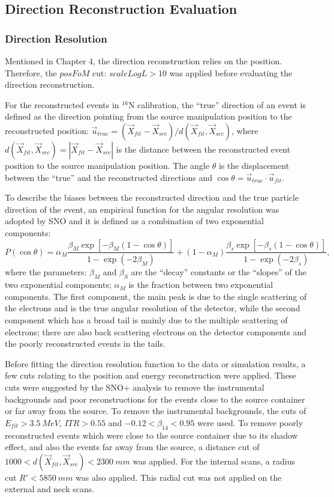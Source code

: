 \subsection{Direction Reconstruction Evaluation}
\subsubsection{Direction Resolution}
Mentioned in Chapter 4, the direction reconstruction relies on the position. Therefore, the $posFoM$ cut: $scaleLogL>10$ was applied before evaluating the direction reconstruction. 

For the reconstructed events in $^{16}$N calibration, the ``true'' direction of an event is defined as the direction pointing from the source manipulation position to the reconstructed position: $\vec{u}_{true} = (\vec{X}_{fit}-\vec{X}_{src})/d(\vec{X}_{fit},\vec{X}_{src})$, where $d(\vec{X}_{fit},\vec{X}_{src})=|\vec{X}_{fit}-\vec{X}_{src}|$ is the distance between the reconstructed event position to the source manipulation position. The angle $\theta$ is the displacement between the ``true'' and the reconstructed directions and $\cos\theta=\vec{u}_{true}\cdot \vec{u}_{fit}$.

To describe the biases between the reconstructed direction and the true particle direction of the event, an empirical function for the angular resolution was adopted by SNO\cite{boulay2004direct} and it is defined as a combination of two exponential components:
\begin{equation}
P(\cos\theta)=\alpha_M\frac{\beta_M\exp[-\beta_M(1-\cos\theta)]}{1-\exp(-2\beta_M)}+(1-\alpha_M)\frac{\beta_s\exp[-\beta_s(1-\cos\theta)]}{1-\exp(-2\beta_s)},
\end{equation}
where the parameters: $\beta_M$ and $\beta_S$ are the ``decay'' constants or the ``slopes'' of the two exponential components; $\alpha_M$ is the fraction between two exponential components. The first component, the main peak is due to the single scattering of the electrons and is the true angular resolution of the detector, while the second component which has a broad tail is mainly due to the multiple scattering of electrons; there are also back scattering electrons on the detector components and the poorly reconstructed events in the tails\cite{boulay2004direct}.

Before fitting the direction resolution function to the data or simulation results, a few cuts relating to the position and energy reconstruction were applied. These cuts were suggested by the SNO+ analysis to remove the instrumental backgrounds and poor reconstructions for the events close to the source container or far away from the source. To remove the instrumental backgrounds, the cuts of $E_{fit}>3.5~MeV$, $ITR>0.55$ and $-0.12<\beta_{14}<0.95$ were used. To remove poorly reconstructed events which were close to the source container due to its shadow effect, and also the events far away from the source, a distance cut of $1000<d(\vec{X}_{fit},\vec{X}_{src})<2300~mm$ was applied. For the internal scans, a radius cut $R'<5850~mm$ was also applied. This radial cut was not applied on the external and neck scans\cite{waterunidoc}.

